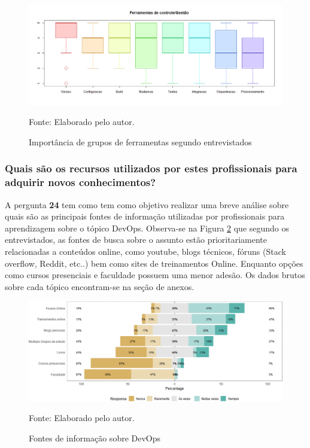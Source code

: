 \documentclass[twoside,english,brazilian]{UNISINOSartigo}
\newcommand{\source}[1]{\caption*{Fonte: {#1}} }
\begin{document}
\begin{figure}[H]
    \centering
    \caption{Importância de grupos de ferramentas segundo entrevistados}
       \includegraphics[scale=.5]{imagens/Rplot05.png}
        \source{Elaborado pelo autor.}
    \label{fig:importFerramentas}
\end{figure}



\subsubsection{Quais são os recursos  utilizados por estes profissionais para adquirir novos conhecimentos?}
A pergunta \textbf{24} tem como tem como objetivo realizar uma breve análise sobre quais são as principais fontes de informação utilizadas por profissionais para aprendizagem sobre o tópico DevOps. Observa-se na Figura \ref{fig:fontesConhecimento} que segundo os entrevistados, as fontes de busca sobre o assunto estão prioritariamente relacionadas a conteúdos online, como youtube, blogs técnicos, fóruns (Stack overflow,  Reddit, etc..) bem como sites de treinamentos Online. Enquanto opções como cursos presenciais e faculdade possuem uma menor adesão. Os dados brutos sobre cada tópico encontram-se na seção de anexos.
\begin{figure}[H]
    \centering
    \caption{Fontes de informação sobre DevOps}
       \includegraphics[scale=.5]{imagens/questao24.png}
       \source{Elaborado pelo autor.}
    \label{fig:fontesConhecimento}
\end{figure}
\end{document}
